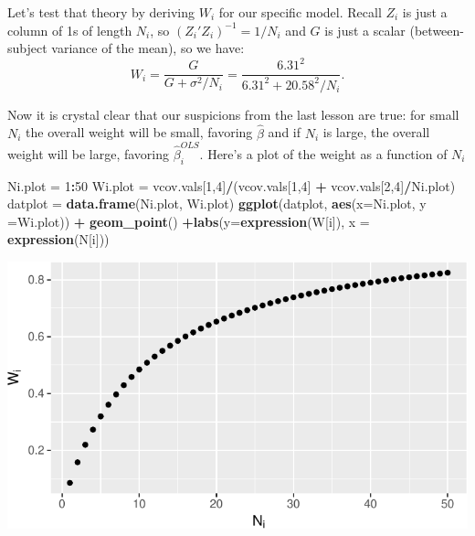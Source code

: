 \documentclass[
]{book}
\newenvironment{Shaded}{\begin{snugshade}}{\end{snugshade}}
\newcommand{\DataTypeTok}[1]{\textcolor[rgb]{0.13,0.29,0.53}{#1}}
\newcommand{\DecValTok}[1]{\textcolor[rgb]{0.00,0.00,0.81}{#1}}
\newcommand{\KeywordTok}[1]{\textcolor[rgb]{0.13,0.29,0.53}{\textbf{#1}}}
\newcommand{\NormalTok}[1]{#1}
\newcommand{\OperatorTok}[1]{\textcolor[rgb]{0.81,0.36,0.00}{\textbf{#1}}}
\newcommand{\StringTok}[1]{\textcolor[rgb]{0.31,0.60,0.02}{#1}}
\begin{document}
Let's test that theory by deriving \(W_i\) for our specific model. Recall \(Z_i\) is just a column of 1s of length \(N_i\), so \((Z_i'Z_i)^{-1} = 1/N_i\) and \(G\) is just a scalar (between-subject variance of the mean), so we have: \[W_i  = \frac{G}{G+\sigma^2/N_i}=\frac{6.31^2}{6.31^2+20.58^2/N_i}.\]

Now it is crystal clear that our suspicions from the last lesson are true: for small \(N_i\) the overall weight will be small, favoring \(\hat\beta\) and if \(N_i\) is large, the overall weight will be large, favoring \(\hat\beta^{OLS}_i\). Here's a plot of the weight as a function of \(N_i\)

\begin{Shaded}
\begin{Highlighting}[]
\NormalTok{Ni.plot =}\StringTok{ }\DecValTok{1}\OperatorTok{:}\DecValTok{50}
\NormalTok{Wi.plot =}\StringTok{ }\NormalTok{vcov.vals[}\DecValTok{1}\NormalTok{,}\DecValTok{4}\NormalTok{]}\OperatorTok{/}\NormalTok{(vcov.vals[}\DecValTok{1}\NormalTok{,}\DecValTok{4}\NormalTok{] }\OperatorTok{+}\StringTok{ }\NormalTok{vcov.vals[}\DecValTok{2}\NormalTok{,}\DecValTok{4}\NormalTok{]}\OperatorTok{/}\NormalTok{Ni.plot)}
\NormalTok{datplot =}\StringTok{ }\KeywordTok{data.frame}\NormalTok{(Ni.plot, Wi.plot)}
\KeywordTok{ggplot}\NormalTok{(datplot, }\KeywordTok{aes}\NormalTok{(}\DataTypeTok{x=}\NormalTok{Ni.plot, }\DataTypeTok{y =}\NormalTok{Wi.plot)) }\OperatorTok{+}\StringTok{ }\KeywordTok{geom\_point}\NormalTok{() }\OperatorTok{+}\KeywordTok{labs}\NormalTok{(}\DataTypeTok{y=}\KeywordTok{expression}\NormalTok{(W[i]), }\DataTypeTok{x =} \KeywordTok{expression}\NormalTok{(N[i]))}
\end{Highlighting}
\end{Shaded}

\begin{center}\includegraphics{3_video5_win_sub_mns_vs_cond_modes_files/figure-latex/unnamed-chunk-4-1} \end{center}
\end{document}
